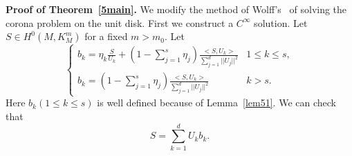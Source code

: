 {\bf Proof of Theorem~\ref{5main}.} 
We modify the method of Wolff's~\cite{WT} of solving the corona problem
on the unit disk.
 First we construct a $C^\infty$ solution. Let $S\in
H^0(M,K_M^m)$ for a fixed $m>m_0$.
Let
\begin{equation}\label{5-b1}
\left\{
\begin{array}{ll}
 b_k=\eta_k\frac{S}{U_k}+(1-\sum_{j=1}^s\eta_j)
\frac{<S, U_k>}{\sum_{j=1}^d||U_j||^2}& 1\leq k\leq s,\\
 b_k=(1-\sum_{j=1}^s\eta_j)\frac{<S, U_k>}{\sum_{j=1}^d||U_j||^2}
& k>s.
\end{array}
\right.
\end{equation}
Here $b_k (1\leq k\leq s)$ is well defined
because of Lemma~\ref{lem51}. We can check that
\[
S=\sum_{k=1}^d U_k b_k.
\]



